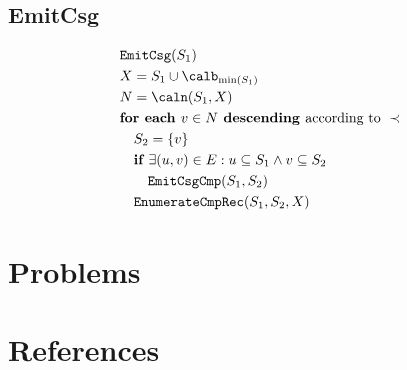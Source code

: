 \documentclass[11pt]{article}
\begin{document}
\subsection{EmitCsg}
\label{sec:org32c6212}
\begin{align*}
&\texttt{EmitCsg}(S_1)\\
&X=S_1\cup\calb_{\min(S_1)}\\
&N=\caln(S_1,X)\\
&\textbf{for each }v\in N\textbf{ descending }\text{according to }\prec\\
&\quad S_2=\{v\}\\
&\quad\textbf{if }\exists(u,v)\in E:u\subseteq S_1\wedge v\subseteq S_2\\
&\quad\quad\texttt{EmitCsgCmp}(S_1,S_2)\\
&\quad\texttt{EnumerateCmpRec}(S_1,S_2,X)
\end{align*}
\section{Problems}
\label{sec:org15f8b18}


\section{References}
\label{sec:org2653cac}
\label{bibliographystyle link}


\label{bibliography link}

\end{document}

